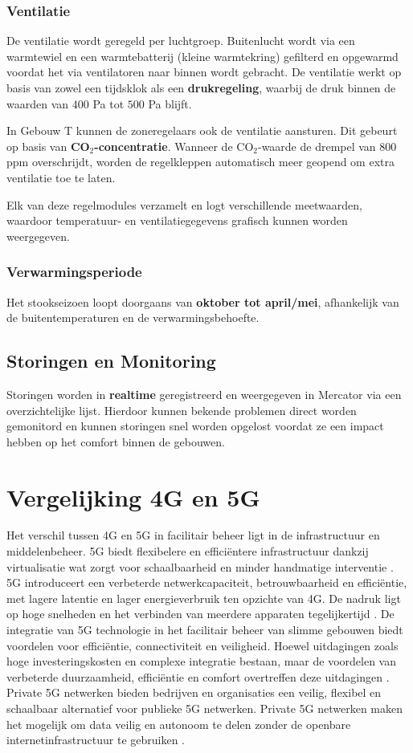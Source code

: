 \subsubsection{Ventilatie}
De ventilatie wordt geregeld per luchtgroep. Buitenlucht wordt via een warmtewiel en een warmtebatterij (kleine warmtekring) gefilterd en opgewarmd voordat het via ventilatoren naar binnen wordt gebracht. De ventilatie werkt op basis van zowel een tijdsklok als een \textbf{drukregeling}, waarbij de druk binnen de waarden van $400$ Pa tot $500$ Pa blijft.

In Gebouw T kunnen de zoneregelaars ook de ventilatie aansturen. Dit gebeurt op basis van \textbf{CO$_2$-concentratie}. Wanneer de CO$_2$-waarde de drempel van $800$ ppm overschrijdt, worden de regelkleppen automatisch meer geopend om extra ventilatie toe te laten.

Elk van deze regelmodules verzamelt en logt verschillende meetwaarden, waardoor temperatuur- en ventilatiegegevens grafisch kunnen worden weergegeven.

\subsubsection{Verwarmingsperiode}
Het stookseizoen loopt doorgaans van \textbf{oktober tot april/mei}, afhankelijk van de buitentemperaturen en de verwarmingsbehoefte.

\subsection{Storingen en Monitoring}
Storingen worden in \textbf{realtime} geregistreerd en weergegeven in Mercator via een overzichtelijke lijst. Hierdoor kunnen bekende problemen direct worden gemonitord en kunnen storingen snel worden opgelost voordat ze een impact hebben op het comfort binnen de gebouwen.

\section{Vergelijking 4G en 5G}
Het verschil tussen 4G en 5G in facilitair beheer ligt in de infrastructuur en middelenbeheer. 5G biedt flexibelere en efficiëntere infrastructuur dankzij virtualisatie wat zorgt voor schaalbaarheid en minder handmatige interventie \autocite{degambur2021resource}. 5G introduceert een verbeterde netwerkcapaciteit, betrouwbaarheid en efficiëntie, met lagere latentie en lager energieverbruik ten opzichte van 4G. De nadruk ligt op hoge snelheden en het verbinden van meerdere apparaten tegelijkertijd \autocite{mihret20214g}. De integratie van 5G technologie in het facilitair beheer van slimme gebouwen biedt voordelen voor efficiëntie, connectiviteit en veiligheid. Hoewel uitdagingen zoals hoge investeringskosten en complexe integratie bestaan, maar de voordelen van verbeterde duurzaamheid, efficiëntie en comfort overtreffen deze uitdagingen \autocite{Markogiannaki2023}. Private 5G netwerken bieden bedrijven en organisaties een veilig, flexibel en schaalbaar alternatief voor publieke 5G netwerken. Private 5G netwerken maken het mogelijk om data veilig en autonoom te delen zonder de openbare internetinfrastructuur te gebruiken \autocite{eswaran2023private}.

